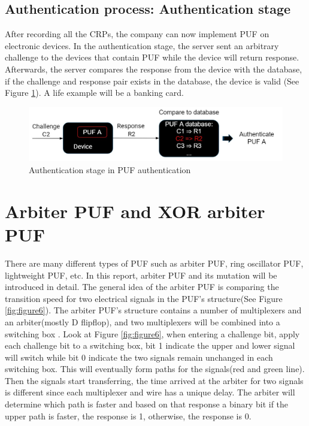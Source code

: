 \subsection{Authentication process: Authentication stage}
After recording all the CRPs, the company can now implement PUF on electronic devices.
In the authentication stage, the server sent an arbitrary challenge to the devices that contain PUF while the device will return response. Afterwards, the server compares the response from the device with the database, 
if the challenge and response pair exists in the database, the device is valid \cite{Reference2} (See Figure \ref{fig:figure5}). A life example will be a banking card.

\begin{figure}[htp]
    \centering
    \includegraphics[width=14cm]{figures/figure5.jpg}
    \caption{Authentication stage in PUF authentication}
    \label{fig:figure5}
    \end{figure}

\section{Arbiter PUF and XOR arbiter PUF}
There are many different types of PUF such as arbiter PUF, ring oscillator PUF, lightweight PUF, etc. In this report, arbiter PUF and its mutation will be introduced in detail. The general idea of
the arbiter PUF is comparing the transition speed for two electrical signals in the PUF's structure(See Figure \ref{fig:figure6}). The arbiter PUF's structure contains a number of 
multiplexers and an arbiter(mostly D flipflop), and two multiplexers will be combined into a switching box \cite{Reference3}. Look at Figure \ref{fig:figure6}, when entering a challenge bit, apply each challenge bit to a switching box, bit 1 indicate the upper and lower signal will switch 
while bit 0 indicate the two signals remain unchanged in each switching box. This will eventually form paths for the signals(red and green line). Then the signals start transferring, the time arrived at the arbiter for two signals 
is different since each multiplexer and wire has a unique delay. The arbiter will determine which path is faster and based on that response a binary bit if the upper path is faster, the response is 1, 
otherwise, the response is 0. \par

